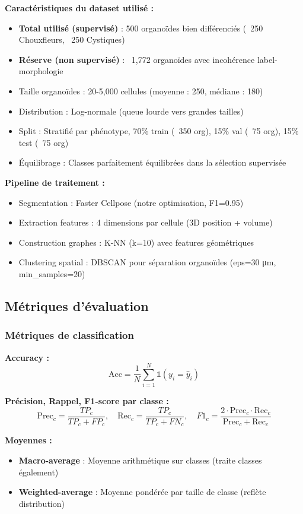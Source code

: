\textbf{Caractéristiques du dataset utilisé :}
\begin{itemize}
    \item \textbf{Total utilisé (supervisé)} : 500 organoïdes bien différenciés (~250 Chouxfleurs, ~250 Cystiques)
    \item \textbf{Réserve (non supervisé)} : ~1,772 organoïdes avec incohérence label-morphologie
    \item Taille organoïdes : 20-5,000 cellules (moyenne : 250, médiane : 180)
    \item Distribution : Log-normale (queue lourde vers grandes tailles)
    \item Split : Stratifié par phénotype, 70\% train (~350 org), 15\% val (~75 org), 15\% test (~75 org)
    \item Équilibrage : Classes parfaitement équilibrées dans la sélection supervisée
\end{itemize}

\textbf{Pipeline de traitement :}
\begin{itemize}
    \item Segmentation : Faster Cellpose (notre optimisation, F1=0.95)
    \item Extraction features : 4 dimensions par cellule (3D position + volume)
    \item Construction graphes : K-NN (k=10) avec features géométriques
    \item Clustering spatial : DBSCAN pour séparation organoïdes (eps=30 μm, min\_samples=20)
\end{itemize}

\subsection{Métriques d'évaluation}

\subsubsection{Métriques de classification}

\textbf{Accuracy :}
\[
\text{Acc} = \frac{1}{N}\sum_{i=1}^N \mathbb{1}(y_i = \hat{y}_i)
\]

\textbf{Précision, Rappel, F1-score par classe :}
\[
\text{Prec}_c = \frac{TP_c}{TP_c + FP_c}, \quad \text{Rec}_c = \frac{TP_c}{TP_c + FN_c}, \quad F1_c = \frac{2 \cdot \text{Prec}_c \cdot \text{Rec}_c}{\text{Prec}_c + \text{Rec}_c}
\]

\textbf{Moyennes :}
\begin{itemize}
    \item \textbf{Macro-average} : Moyenne arithmétique sur classes (traite classes également)
    \item \textbf{Weighted-average} : Moyenne pondérée par taille de classe (reflète distribution)
\end{itemize}

